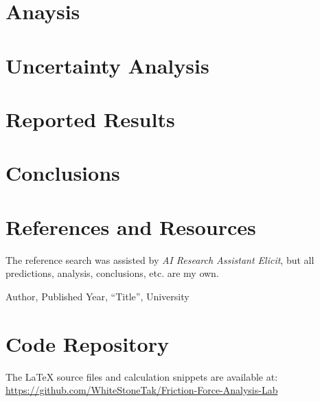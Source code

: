 \documentclass[12pt]{article}
\begin{document}
\newpage
\section{Anaysis}

\newpage
\section{Uncertainty Analysis}

\newpage
\section{Reported Results}

\newpage
\section{Conclusions}

\newpage
\section{References and Resources}

The reference search was assisted by \emph{AI Research Assistant Elicit}, but all predictions, analysis, conclusions, etc. are my own.

\begin{thebibliography}{9}

Author, Published Year, ``Title'', University

\end{thebibliography}


\section*{Code Repository}
\vspace{0.5em}
The LaTeX source files and calculation snippets are available at:  
\url{https://github.com/WhiteStoneTak/Friction-Force-Analysis-Lab}
\end{document}
